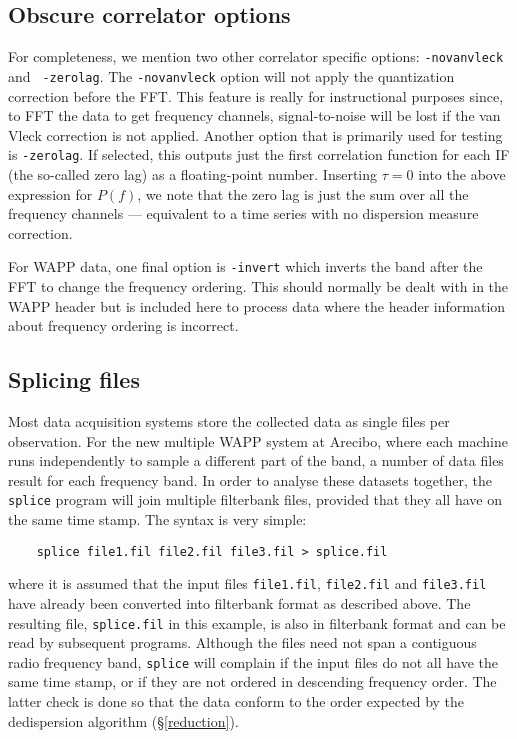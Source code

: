 \documentclass[11pt]{article}
\begin{document}
\subsection*{Obscure correlator options} For completeness, we mention two
other correlator specific options: {\tt -novanvleck} and {\tt
-zerolag}. The {\tt -novanvleck} option will not apply the
quantization correction before the FFT. This feature is really for
instructional purposes since, to FFT the data to get frequency
channels, signal-to-noise will be lost if the van Vleck correction
is not applied. Another option that
is primarily used for testing is {\tt -zerolag}. If selected, this
outputs just the first correlation function for each IF (the so-called
zero lag) as a floating-point number. Inserting $\tau=0$ into the
above expression for $P(f)$, we note that the zero lag is just the sum
over all the frequency channels --- equivalent to a time series with
no dispersion measure correction. 

For WAPP data, one final option is {\tt -invert}
which inverts the band after the FFT to change the frequency ordering.
This should normally be dealt with in the WAPP header but is included
here to process data where the header information about frequency
ordering is incorrect.

\subsection*{Splicing files}

Most data acquisition systems store the collected data as single
files per observation. For the new multiple WAPP system at Arecibo,
where each machine runs independently to sample a different part of
the band, a number of data files result for each frequency band.
In order to analyse these datasets together, the {\tt splice} program
will join multiple filterbank files, provided that they all have
on the same time stamp. The syntax is very simple:
\begin{verbatim}
	splice file1.fil file2.fil file3.fil > splice.fil
\end{verbatim}
where it is assumed that the input files \verb+file1.fil+, \verb+file2.fil+ and
\verb+file3.fil+ have already been converted into filterbank format
as described above. The resulting file, \verb+splice.fil+ in this
example, is also in filterbank format and can be read by subsequent
programs. Although the files need not span a contiguous
radio frequency band,
{\tt splice} will complain if the input files do not
all have the same time stamp, or if they are not ordered in
descending frequency order. The latter check is done so
that the data conform to the order expected by the 
dedispersion algorithm (\S \ref{reduction}).
\end{document}

